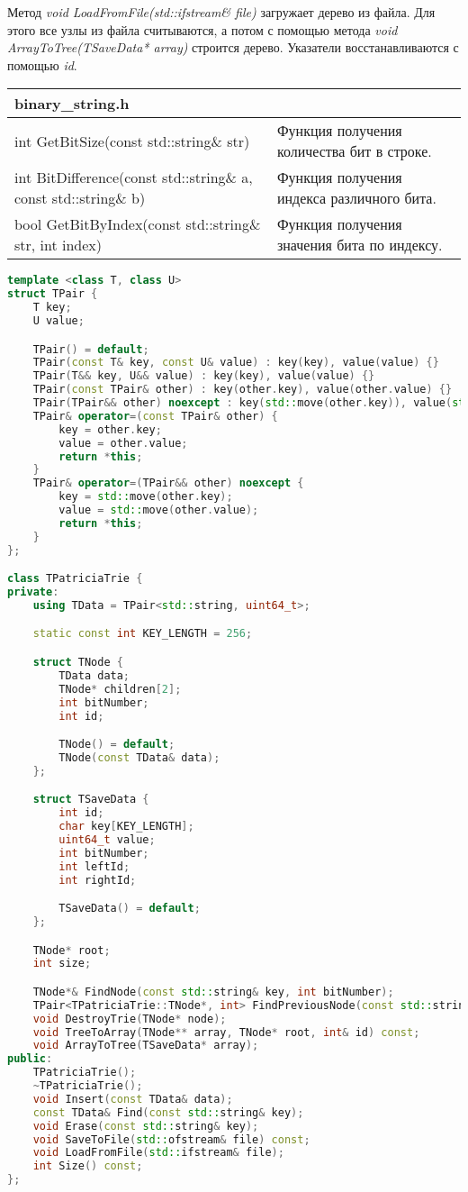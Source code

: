 Метод \textit{void LoadFromFile(std::ifstream\& file)} загружает дерево из файла. Для этого все узлы из файла считываются, а потом с помощью
метода \textit{void ArrayToTree(TSaveData* array)} строится дерево. Указатели восстанавливаются с помощью \textit{id}.

\begin{longtable}{|p{7.5cm}|p{7.5cm}|}
\hline
\rowcolor{lightgray}
\multicolumn{2}{|c|} {binary\_string.h}\\
\hline
int GetBitSize(const std::string\& str)&Функция получения количества бит в строке.\\
\hline
int BitDifference(const std::string\& a, const std::string\& b)&Функция получения индекса различного бита.\\
\hline
bool GetBitByIndex(const std::string\& str, int index)&Функция получения значения бита по индексу.\\
\hline
\end{longtable}

\begin{lstlisting}[language=C++]
template <class T, class U>
struct TPair {
	T key;
	U value;

	TPair() = default;
	TPair(const T& key, const U& value) : key(key), value(value) {}
	TPair(T&& key, U&& value) : key(key), value(value) {}
	TPair(const TPair& other) : key(other.key), value(other.value) {}
	TPair(TPair&& other) noexcept : key(std::move(other.key)), value(std::move(other.value)) {}
	TPair& operator=(const TPair& other) {
		key = other.key;
		value = other.value;
		return *this;
	}
	TPair& operator=(TPair&& other) noexcept {
		key = std::move(other.key);
		value = std::move(other.value);
		return *this;
	}
};

class TPatriciaTrie {
private:
	using TData = TPair<std::string, uint64_t>;

	static const int KEY_LENGTH = 256;

	struct TNode {
		TData data;
		TNode* children[2];
		int bitNumber;
		int id;

		TNode() = default;
		TNode(const TData& data);
	};

	struct TSaveData {
		int id;
		char key[KEY_LENGTH];
		uint64_t value;
		int bitNumber;
		int leftId;
		int rightId;

		TSaveData() = default;
	};

	TNode* root;
	int size;

	TNode*& FindNode(const std::string& key, int bitNumber);
	TPair<TPatriciaTrie::TNode*, int> FindPreviousNode(const std::string& key, int bitNumber);
	void DestroyTrie(TNode* node);
	void TreeToArray(TNode** array, TNode* root, int& id) const;
	void ArrayToTree(TSaveData* array);
public:
	TPatriciaTrie();
	~TPatriciaTrie();
	void Insert(const TData& data);
	const TData& Find(const std::string& key);
	void Erase(const std::string& key);
	void SaveToFile(std::ofstream& file) const;
	void LoadFromFile(std::ifstream& file);
	int Size() const;
};
\end{lstlisting}
\pagebreak

